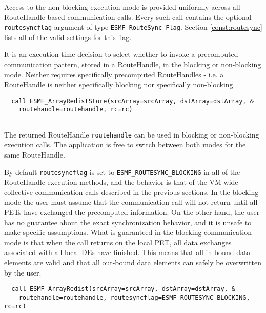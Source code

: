    Access to the non-blocking execution mode is provided uniformly across all
   RouteHandle based communication calls. Every such call contains the optional
   {\tt routesyncflag} argument of type {\tt ESMF\_RouteSync\_Flag}. Section
   \ref{const:routesync} lists all of the valid settings for this flag.
  
   It is an execution time decision to select whether to invoke a precomputed
   communication pattern, stored in a RouteHandle, in the blocking or
   non-blocking mode. Neither requires specifically precomputed RouteHandles
   - i.e. a RouteHandle is neither specifically blocking nor specifically
   non-blocking. 

 \begin{verbatim}
  call ESMF_ArrayRedistStore(srcArray=srcArray, dstArray=dstArray, &
    routehandle=routehandle, rc=rc)
 
\end{verbatim}
 

   The returned RouteHandle {\tt routehandle} can be used in blocking or 
   non-blocking execution calls. The application is free to switch between
   both modes for the same RouteHandle.
  
   By default {\tt routesyncflag} is set to {\tt ESMF\_ROUTESYNC\_BLOCKING} in all of the
   RouteHandle execution methods, and the behavior is that of the VM-wide
   collective communication calls described in the previous sections. In the
   blocking mode the user must assume that the communication call will not
   return until all PETs have exchanged the precomputed information. On the
   other hand, the user has no guarantee about the exact synchronization 
   behavior, and it is unsafe to make specific assumptions. What is guaranteed
   in the blocking communication mode is that when the call returns on the
   local PET, all data exchanges associated with all local DEs have finished.
   This means that all in-bound data elements are valid and that all out-bound
   data elements can safely be overwritten by the user. 

 \begin{verbatim}
  call ESMF_ArrayRedist(srcArray=srcArray, dstArray=dstArray, &
    routehandle=routehandle, routesyncflag=ESMF_ROUTESYNC_BLOCKING, rc=rc)
 
\end{verbatim}
 
